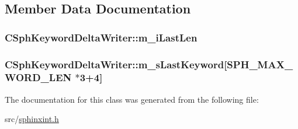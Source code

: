 \subsection{Member Data Documentation}
\hypertarget{classCSphKeywordDeltaWriter_a65949219fcc8cd5e26e177bb1ef2ea7c}{
\subsubsection[{m\-\_\-i\-Last\-Len}]{ C\-Sph\-Keyword\-Delta\-Writer\-::m\-\_\-i\-Last\-Len\hspace{0.3cm}{\ttfamily [private]}}}\label{classCSphKeywordDeltaWriter_a65949219fcc8cd5e26e177bb1ef2ea7c}
\hypertarget{classCSphKeywordDeltaWriter_a0c4213cdcea8b0daa94c729be7d8a307}{
\subsubsection[{m\-\_\-s\-Last\-Keyword}]{ C\-Sph\-Keyword\-Delta\-Writer\-::m\-\_\-s\-Last\-Keyword\mbox{[}{\bf S\-P\-H\-\_\-\-M\-A\-X\-\_\-\-W\-O\-R\-D\-\_\-\-L\-E\-N} $\ast$3+4\mbox{]}\hspace{0.3cm}{\ttfamily [private]}}}\label{classCSphKeywordDeltaWriter_a0c4213cdcea8b0daa94c729be7d8a307}


The documentation for this class was generated from the following file\-:\begin{DoxyCompactItemize}
\item 
src/\hyperlink{sphinxint_8h}{sphinxint.\-h}\end{DoxyCompactItemize}

